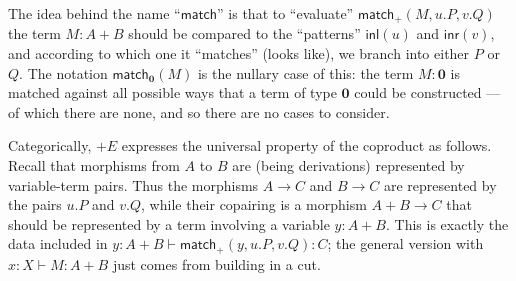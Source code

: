 \documentclass{book}
\let\types\vdash
\def\plusE{\mathord{+}E}
\def\inl{\mathsf{inl}}
\def\inr{\mathsf{inr}}
\def\case{\mathsf{match}_+}
\def\match{\mathsf{match}}
\def\zero{\mathbf{0}}
\def\abort{\match_{\zero}}
\begin{document}
The idea behind the name ``$\match$'' is that to ``evaluate'' $\case(M,u.P,v.Q)$ the term $M:A+B$ should be compared to the ``patterns'' $\inl(u)$ and $\inr(v)$, and according to which one it ``matches'' (looks like), we branch into either $P$ or $Q$.
The notation $\abort(M)$ is the nullary case of this: the term $M:\zero$ is matched against all possible ways that a term of type $\zero$ could be constructed --- of which there are none, and so there are no cases to consider.

Categorically, $\plusE$ expresses the universal property of the coproduct as follows.
Recall that morphisms from $A$ to $B$ are (being derivations) represented by variable-term pairs.
Thus the morphisms $A\to C$ and $B\to C$ are represented by the pairs $u.P$ and $v.Q$, while their copairing is a morphism $A+B\to C$ that should be represented by a term involving a variable $y:A+B$.
This is exactly the data included in $y:A+B\types \case(y,u.P,v.Q):C$; the general version with $x:X\types M:A+B$ just comes from building in a cut.


\end{document}

